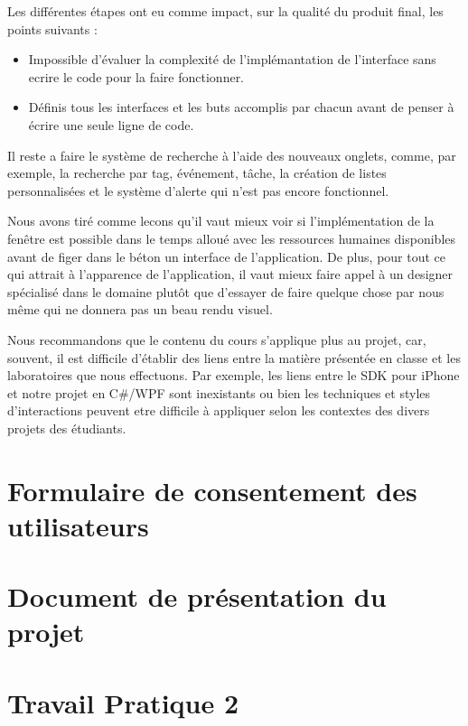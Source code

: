 \documentclass[letterpaper, oneside, 12pt, these, creativecommons]{thETS}
\begin{document}
Les différentes étapes ont eu comme impact, sur la qualité du produit final, les points suivants :

\begin{itemize}
	\item Impossible d'évaluer la complexité de l'implémantation de l'interface sans ecrire le code pour la faire fonctionner.
	\item Définis tous les interfaces et les buts accomplis par chacun avant de penser à écrire une seule ligne de code.
\end{itemize}

Il reste a faire le système de recherche à l'aide des nouveaux onglets, comme, par exemple, la recherche par tag, événement, tâche, la création de listes personnalisées et le système d'alerte qui n'est pas encore fonctionnel.

Nous avons tiré comme lecons qu'il vaut mieux voir si l'implémentation de la fenêtre est possible dans le temps alloué avec les ressources humaines disponibles avant de figer dans le béton un interface de l'application. De plus, pour tout ce qui attrait à l'apparence de l'application, il vaut mieux faire appel à un designer spécialisé dans le domaine plutôt que d'essayer de faire quelque chose par nous même qui ne donnera pas un beau rendu visuel.

Nous recommandons que le contenu du cours s'applique plus au projet, car, souvent, il est difficile d'établir des liens entre la matière présentée en classe et les laboratoires que nous effectuons. Par exemple, les liens entre le SDK pour iPhone et notre projet en C\#/WPF sont inexistants ou bien les techniques et styles d'interactions peuvent etre difficile à appliquer selon les contextes des divers projets des étudiants.

\appendix
\multiannexe

\chapter{Formulaire de consentement des utilisateurs}



\chapter{Document de présentation du projet}



\chapter{Travail Pratique 2}


\end{document}
